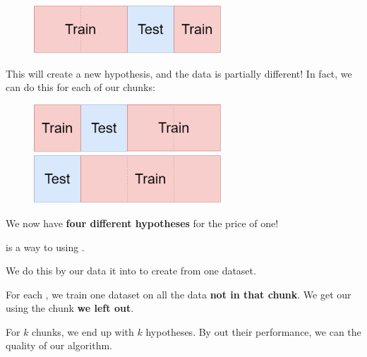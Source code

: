         \begin{figure}[H]
        \centering
            \includegraphics[width=70mm,scale=0.5]{images/regression_images/training_and_test_data_2.png}
        \end{figure}
        
        This will create a new hypothesis, and the data is partially different! In fact, we can do this for each of our chunks:
        
        \begin{figure}[H]
                \includegraphics[width=70mm,scale=0.5]{images/regression_images/training_and_test_data_3.png}
                
                \includegraphics[width=70mm,scale=0.5]{images/regression_images/training_and_test_data_4.png}
            
        \end{figure}
        
        We now have \textbf{four different hypotheses} for the price of one!\\
        
        \begin{definition}
             is a way to  using .
            
            We do this by  our data it into  to create  from one dataset.
            
            For each , we train one dataset on all the data \textbf{not in that chunk}. We get our  using the chunk \textbf{we left out}.
            
            For $k$ chunks, we end up with $k$ hypotheses. By  out their performance, we can  the quality of our algorithm.
        \end{definition}
        
